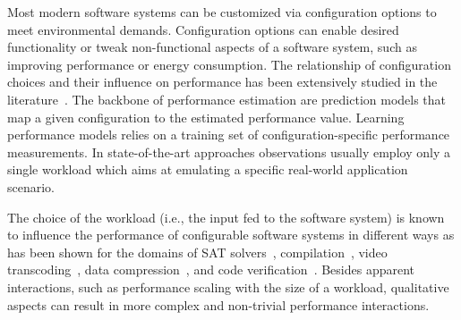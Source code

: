 
Most modern software systems can be customized via configuration options to meet environmental demands. Configuration options can enable desired functionality or tweak non-functional aspects of a software system, such as improving performance or energy consumption. The relationship of configuration choices and their influence on performance has been extensively studied in the literature~\cite{dorn2020,siegmundPerformanceinfluenceModelsHighly2015,haDeepPerf2019,perfAL,guoVariabilityawarePerformancePrediction2013,sarkarCostEfficientSamplingPerformance,guo_2018_data,fourier_learning_2015,perLasso,chen_hinnperf_2022}. The backbone of performance estimation are prediction models that map a given configuration to the estimated performance value. Learning performance models relies on a training set of configuration-specific performance measurements. In state-of-the-art approaches observations usually employ only a single workload which aims at emulating a specific real-world application scenario.

The choice of the workload (i.e., the input fed to the software system) is known to influence the performance of configurable software systems in different ways as has been shown for the domains of SAT solvers~\cite{falkner_sat_solvers_2015,satzilla_2008}, compilation~\cite{ding_compilation_2015,plotnikov_compilation_2013}, video transcoding~\cite{maxiaguine_workload_2004,alves_sampling_2020}, data compression~\cite{khavari_compression_2019}, and code verification~\cite{koc_satune_2021}. Besides apparent interactions, such as performance scaling with the size of a workload, qualitative aspects can result in more complex and non-trivial performance interactions.


